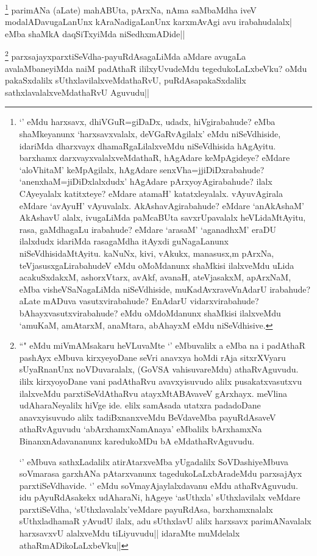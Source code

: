 \begin{artha}
\footnote[1]{`\stext ' eMdu harxsavx, dhiVGuR=giDaDx, udadx, hiVgirabahude? eMba shaMkeyanunx `harxsavxvalalx, deVGaRvAgilalx' eMdu niSeVdhiside, idariMda dharxvayx dhamaRgaLilalxveMdu niSeVdhisida hAgAyitu. barxhamx darxvayxvalalxveMdathaR, hAgAdare keMpAgideye? eMdare `aloVhitaM' keMpAgilalx, hAgAdare senxVha=jjiDiDxrabahude? `anenxhaM=jiDiDxlalxdudx' hAgAdare pArxyoyAgirabahude? ilalx CAyeyalalx katitxteye? eMdare atamaH' katatxleyalalx. vAyuvAgirala eMdare `avAyuH' vAyuvalalx. AkAshavAgirabahude? eMdare `anAkAshaM' AkAshavU alalx, ivugaLiMda paMcaBUta savxrUpavalalx heVLidaMtAyitu, rasa, gaMdhagaLu irabahude? eMdare `arasaM' `aganadhxM' eraDU ilalxdudx idariMda rasagaMdha itAyxdi guNagaLanunx niSeVdhisidaMtAyitu. kaNuNx, kivi, vAkukx, manasusx,m pArxNa, teVjasusxgaLirabahudeV eMdu oMoMdanunx shaMkisi ilalxveMdu uLida acakuSxdakxM, ashorxVtarx, avAkf, avanaH, ateVjasakxM, apArxNaM, eMba visheVSaNagaLiMda niSeVdhiside, muKadAvxraveVnAdarU irabahude? aLate mADuva vasutxvirabahude? EnAdarU vidarxvirabahude? bAhayxvasutxvirabahude? eMdu oMdoMdanunx shaMkisi ilalxveMdu `amuKaM, amAtarxM, anaMtara, abAhayxM eMdu niSeVdhisive.} parimANa (aLate) mahABUta, pArxNa, nAma saMbaMdha iveV modalADavugaLanUnx kAraNadigaLanUnx karxmAvAgi avu irabahudalalx| eMba shaMkA daqSiTxyiMda niSedhxmADide||
\end{artha}


\begin{artha}
\footnote[1]{``\stext " eMdu miVmAMsakaru heVLuvaMte `\stext' eMbuvalilx a eMba na i padAthaR pashAyx eMbuva kirxyeyoDane seVri anavxya hoMdi rAja sitxrXVyaru sUyaRnanUnx noVDuvaralalx, (GoVSA vahisuvareMdu) athaRvAguvudu. ililx kirxyoyoDane vani padAthaRvu avavxyisuvudo alilx pusakatxvasutxvu ilalxveMdu parxtiSeVdAthaRvu atayxMtABAvaveV gArxhayx. meVlina udAharaNeyalilx hiVge ide. elilx samAsada utatxra padadoDane anavxyisuvudo alilx tadiBxnanxveMdu BeVdaveMba payuRdAsaveV athaRvAguvudu `abArxhamxNamAnaya' eMbalilx bArxhamxNa BinanxnAdavananunx karedukoMDu bA eMdathaRvAguvudu. 

`\stext ' eMbuva sathxLadalilx atirAtarxveMba yUgadalilx SoVDashiyeMbuva soVmarasa garxhANa pAtarxvanunx tagedukoLaLxbAradeMdu parxsajAyx parxtiSeVdhavide. `\stext ' eMdu soVmayAjaylalxdavanu eMdu athaRvAguvudu. idu pAyuRdAsakekx udAharaNi, hAgeye `asUthxla' sUthxlavilalx veMdare parxtiSeVdha, `sUthxlavalalx'veMdare payuRdAsa, barxhamxnalalx sUthxladhamaR yAvudU ilalx, adu sUthxlavU alilx harxsavx parimANavalalx harxsavxvU alalxveMdu tiLiyuvudu|| idaraMte muMdelalx athaRmADikoLaLxbeVku||} parxsajayxparxtiSeVdha-payuRdAsagaLiMda aMdare avugaLa avalaMbaneyiMda naiM padAthaR ililxyUvudeMdu tegedukoLaLxbeVku? oMdu pakaSxdalilx sUthxlavilalxveMdathaRvU, puRdAsapakaSxdalilx sathxlavalalxveMdathaRvU Aguvudu||
\end{artha}

